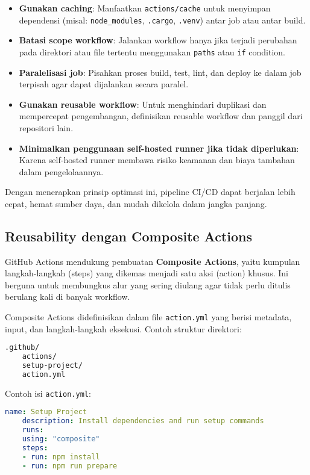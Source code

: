 \begin{itemize}
	\item \textbf{Gunakan caching}: Manfaatkan \texttt{actions/cache} untuk menyimpan dependensi (misal: \texttt{node\_modules}, \texttt{.cargo}, \texttt{.venv}) antar job atau antar build.
	\item \textbf{Batasi scope workflow}: Jalankan workflow hanya jika terjadi perubahan pada direktori atau file tertentu menggunakan \texttt{paths} atau \texttt{if} condition.
	\item \textbf{Paralelisasi job}: Pisahkan proses build, test, lint, dan deploy ke dalam job terpisah agar dapat dijalankan secara paralel.
	\item \textbf{Gunakan reusable workflow}: Untuk menghindari duplikasi dan mempercepat pengembangan, definisikan reusable workflow dan panggil dari repositori lain.
	\item \textbf{Minimalkan penggunaan self-hosted runner jika tidak diperlukan}: Karena self-hosted runner membawa risiko keamanan dan biaya tambahan dalam pengelolaannya.
\end{itemize}

Dengan menerapkan prinsip optimasi ini, pipeline CI/CD dapat berjalan lebih cepat, hemat sumber daya, dan mudah dikelola dalam jangka panjang.

\subsection{Reusability dengan Composite Actions}

GitHub Actions mendukung pembuatan \textbf{Composite Actions}, yaitu kumpulan langkah-langkah (steps) yang dikemas menjadi satu aksi (action) khusus. Ini berguna untuk membungkus alur yang sering diulang agar tidak perlu ditulis berulang kali di banyak workflow.

Composite Actions didefinisikan dalam file \texttt{action.yml} yang berisi metadata, input, dan langkah-langkah eksekusi. Contoh struktur direktori:

\begin{lstlisting}[language=bash, caption={Struktur direktori composite action}]
	.github/
	actions/
	setup-project/
	action.yml
\end{lstlisting}

Contoh isi \texttt{action.yml}:

\begin{lstlisting}[language=yaml, caption={Contoh isi file action.yml}]
	name: Setup Project
	description: Install dependencies and run setup commands
	runs:
	using: "composite"
	steps:
	- run: npm install
	- run: npm run prepare
\end{lstlisting}

